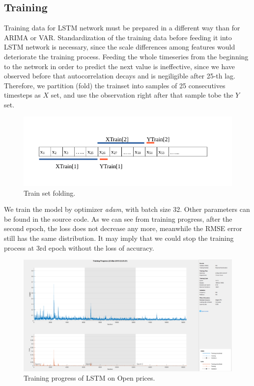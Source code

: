 \documentclass[11pt]{article}
\begin{document}
\subsection{Training}
Training data for LSTM network must be prepared in a different way than for
ARIMA or VAR. Standardization of the training data before feeding it into LSTM
network is necessary, since the scale differences among features would
deteriorate the training process. Feeding the whole timeseries from the
beginning to the network in order to predict the next value is ineffective,
since we have observed before that autocorrelation decays and is negiligible
after 25-th lag. Therefore, we partition (fold) the trainset into samples of 25
consecutives timesteps as $X$ set, and use the observation right after that
sample tobe the $Y$ set.
\begin{figure}[H]
  \centering
  \includegraphics[width=\textwidth,keepaspectratio]{figs/train_cut.png}
  \caption{Train set folding.}
\end{figure}


We train the model by optimizer \textit{adam}, with batch size 32. Other
parameters can be found in the source code. As we can see from training
progress, after the second epoch, the loss does not decrease any more, meanwhile
the RMSE error still has the same distribution. It may imply that we could stop
the training process at 3rd epoch without the loss of accuracy.
\begin{figure}[H]
  \centering
  \includegraphics[width=\textwidth,keepaspectratio]{figs/training_lstm.png}
  \caption{Training progress of LSTM on Open prices.}
\end{figure}
\end{document}
